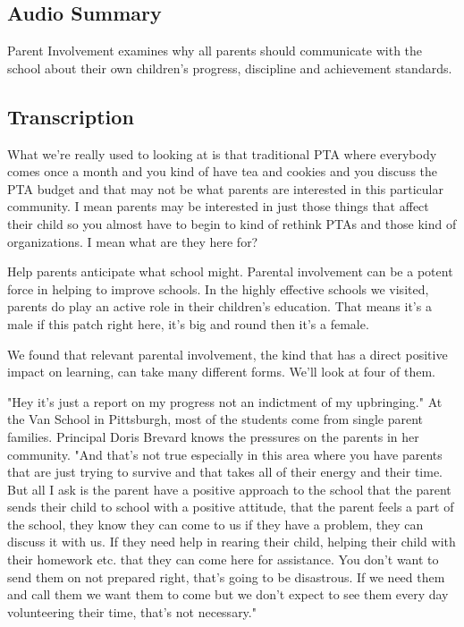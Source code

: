\subsection{Audio Summary}

Parent Involvement examines why all parents should communicate with the school about their own children's progress, discipline and achievement standards.

\subsection{Transcription}

What we're really used to looking at is that traditional PTA where everybody comes once a month and you kind of have tea and cookies and you discuss the PTA budget and that may not be what parents are interested in this particular community.
I mean parents may be interested in just those things that affect their child so you almost have to begin to kind of rethink PTAs and those kind of organizations.
I mean what are they here for?

Help parents anticipate what school might.
Parental involvement can be a potent force in helping to improve schools.
In the highly effective schools we visited, parents do play an active role in their children's education.
That means it's a male if this patch right here, it's big and round then it's a female.

We found that relevant parental involvement, the kind that has a direct positive impact on learning, can take many different forms.
We'll look at four of them.

"Hey it's just a report on my progress not an indictment of my upbringing." At the Van School in Pittsburgh, most of the students come from single parent families.
Principal Doris Brevard knows the pressures on the parents in her community.
"And that's not true especially in this area where you have parents that are just trying to survive and that takes all of their energy and their time.
But all I ask is the parent have a positive approach to the school that the parent sends their child to school with a positive attitude, that the parent feels a part of the school, they know they can come to us if they have a problem, they can discuss it with us.
If they need help in rearing their child, helping their child with their homework etc.
that they can come here for assistance.
You don't want to send them on not prepared right, that's going to be disastrous.
If we need them and call them we want them to come but we don't expect to see them every day volunteering their time, that's not necessary."

